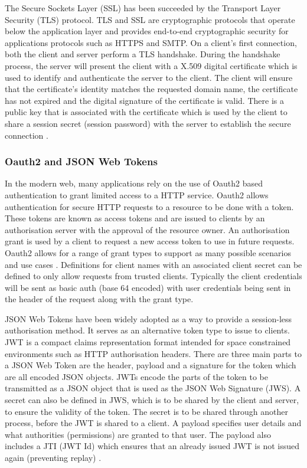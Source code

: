 The Secure Sockets Layer (SSL) has been succeeded by the Transport Layer Security (TLS) protocol.
TLS and SSL are cryptographic protocols that operate below the application layer and provides end-to-end cryptographic security for
applications protocols such as HTTPS and SMTP.
On a client's first connection, both the client and server perform a TLS handshake. During the handshake process, the server will present
the client with a X.509 digital certificate which is used to identify and authenticate the server to the client.
The client will ensure that the certificate's identity matches the requested domain name, the certificate has not expired and the digital 
signature of the certificate is valid.
There is a public key that is associated with the certificate which is used by the client to share a session secret (session password)
with the server to establish the secure connection  \cite{durumeric2013analysis}\cite{thomas2000ssl}.

\subsubsection{Oauth2 and JSON Web Tokens}
In the modern web, many applications rely on the use of Oauth2 based authentication to grant limited access to a HTTP service.
Oauth2 allows authentication for secure HTTP requests to a resource to be done with a token.
These tokens are known as access tokens and are issued to clients by an authorisation server with the approval of the resource
owner.
An authorisation grant is used by a client to request a new access token to use in future requests.
Oauth2 allows for a range of grant types to support as many possible scenarios and use cases \cite{jones2015json}. 
Definitions for client names with an associated client secret can be defined to only allow requests from trusted clients.
Typically the client credentials will be sent as basic auth (base 64 encoded) with user credentials being sent in the header 
of the request along with the grant type.

JSON Web Tokens have been widely adopted as a way to provide a session-less authorisation method.
It serves as an alternative token type to issue to clients.
JWT is a compact claims representation format intended for space constrained environments such as HTTP authorisation headers.
There are three main parts to a JSON Web Token are the header, payload and a signature for the token which are all encoded
JSON objects. 
JWTs encode the parts of the token to be transmitted as a JSON object that is used as the JSON Web Signature (JWS).
A secret can also be defined in JWS, which is to be shared by the client and server, to ensure the validity of the token.
The secret is to be shared through another process, before the JWT is shared to a client.
A payload specifies user details and what authorities (permissions) are granted to that user. The payload also includes a
JTI (JWT Id) which ensures that an already issued JWT is not issued again (preventing replay) \cite{bradley2015json}.

